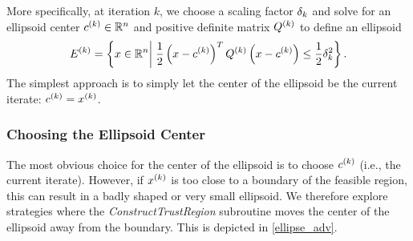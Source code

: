 More specifically, at iteration $k$, we choose a scaling factor $\delta_k$ and solve for an ellipsoid center $c^{(k)} \in \mathbb R^n$ and positive definite matrix ${Q^{(k)}}$ to define an ellipsoid
\begin{align*}
{E^{(k)}} = \left\{x \in \mathbb R^n \bigg| \; \frac 1 2 \left(x - c^{(k)}\right)^T{Q^{(k)}}\left(x - c^{(k)}\right) \le \frac 1 2 \delta_k^2 \right\}.
\end{align*}
The simplest approach is to simply let the center of the ellipsoid be the current iterate: $c^{(k)} = x^{(k)}$.















\subsubsection{Choosing the Ellipsoid Center}
\label{center_searches}

The most obvious choice for the center of the ellipsoid is to choose $c^{(k)}$ (i.e., the current iterate).  
However, if $x^{(k)}$ is too close to a boundary of the feasible region, this can result in a badly shaped or very small ellipsoid.
We therefore explore strategies where the \emph{ConstructTrustRegion} subroutine moves the center of the ellipsoid away from the boundary. 
This is depicted in \cref{ellipse_adv}.



